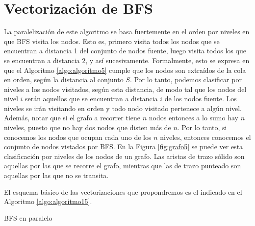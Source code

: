 \section{Vectorización de BFS}

La paralelización de este algoritmo se basa fuertemente en el orden por niveles en que BFS visita los nodos. Esto es, primero visita todos los nodos que se encuentran a distancia 1 del conjunto de nodos fuente, luego visita todos los que se encuentran a distancia 2, y así sucesivamente. Formalmente, esto se expresa en que el Algoritmo \ref{algo:algoritmo5} cumple que los nodos son extraídos de la cola en orden, según la distancia al conjunto $S$. Por lo tanto, podemos clasificar por niveles a los nodos visitados, según esta distancia, de modo tal que los nodos del nivel $i$ serán aquellos que se encuentran a distancia $i$ de los nodos fuente. Los niveles se irán visitando en orden y todo nodo visitado pertenece a algún nivel. Además, notar que si el grafo a recorrer tiene $n$ nodos entonces a lo sumo hay $n$ niveles, puesto que no hay dos nodos que disten más de $n$. Por lo tanto, si conocemos los nodos que ocupan cada uno de los $n$ niveles, entonces conocemos el conjunto de nodos vistados por BFS. En la Figura \ref{fig:grafo5} se puede ver esta clasificación por niveles de los nodos de un grafo. Las aristas de trazo sólido son aquellas por las que se recorre el grafo, mientras que las de trazo punteado son aquellas por las que no se transita.

El esquema básico de las vectorizaciones que propondremos es el indicado en el Algoritmo \ref{algo:algoritmo15}.

\begin{algorithm}
	\DontPrintSemicolon
 	\BlankLine
\caption{BFS en paralelo}
\label{algo:algoritmo15}
\end{algorithm}


